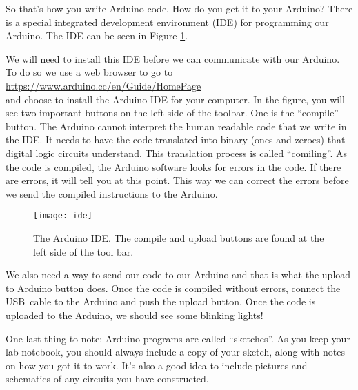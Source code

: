 So that's how you write Arduino code. How do you get it to your Arduino? 
There is a special integrated development environment (IDE) for 
programming our Arduino. The IDE can be seen in Figure \ref{fig:ide}.

We will need to install this IDE before we can communicate with our 
Arduino. To do so we use a web browser to go to\\

\href{https://www.arduino.cc/en/Guide/HomePage}{https://www.arduino.cc/en/Guide/HomePage}\\

\noindent and choose to install the Arduino IDE for your computer. 
In the figure, you will see two important buttons on the left side of the 
toolbar. One is the ``compile'' button. The Arduino cannot interpret the 
human readable code that we write in the IDE. It needs to have the code 
translated into binary (ones and zeroes) that digital logic circuits understand.
This translation process is called ``comiling''. As the code is compiled, the
Arduino software looks for errors in the code. If there are errors, it will
tell you at this point. This way we can correct the errors before we send 
the compiled instructions to the Arduino.
\begin{figure}[hbp!]
\centering
\texttt{[image: ide]}
\caption[The Arduino IDE]{The Arduino IDE. The compile and upload buttons are
found at the left side of the tool bar.}
\label{fig:ide}
\end{figure}

We also need a way to send our code to our Arduino and that is what the
upload to Arduino button does. Once the code is compiled without errors,
connect the USB\ cable to the Arduino and push the upload button. Once the 
code is uploaded to the Arduino, we should see some blinking lights!

One last thing to note: Arduino programs are called ``sketches''. As you 
keep your lab notebook, you should always include a copy of your sketch, along
with notes on how you got it to work. It's also a good idea to include 
pictures and schematics of any circuits you have constructed.


